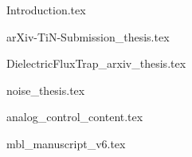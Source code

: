 





\begin{frontmatter}










\cleardoublepage
{}
\begin{singlespace}
\tableofcontents
\end{singlespace}

\end{frontmatter}

\pagestyle{plain} %

{Introduction.tex}

{arXiv-TiN-Submission_thesis.tex}

{DielectricFluxTrap_arxiv_thesis.tex}

{noise_thesis.tex}

{analog_control_content.tex}

{mbl_manuscript_v6.tex}


%
%
\printbibliography


